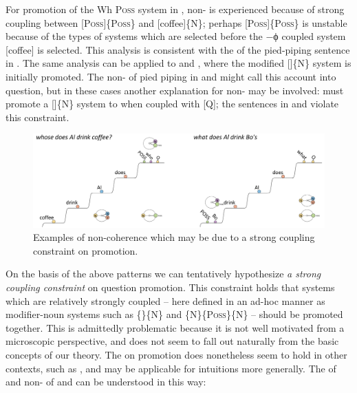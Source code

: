 For promotion of the {\textbar}Wh P\textsc{oss}{\textbar} system in , non- is experienced because of strong coupling between [P\textsc{oss}]\{P\textsc{oss}\} and [coffee]\{N\}; perhaps [P\textsc{oss}]\linebreak\{P\textsc{oss}\} is unstable because of the types of systems which are selected before the −ϕ coupled system [coffee] is selected. This analysis is consistent with the  of the pied-piping sentence in . The same analysis can be applied to  and , where the modified []\{N\} system is initially promoted. The non- of pied piping in  and  might call this account into question, but in these cases another explanation for non- may be involved:  must promote a []\{N\} system to  when coupled with [Q]; the sentences in  and  violate this constraint. 

  
\begin{figure}
\includegraphics[width=\textwidth]{figures/Tilsen-img166.png}
\caption{Examples of non-coherence which may be due to a strong coupling constraint on promotion.}
\label{fig:7:22}
\end{figure}
 

  On the basis of the above patterns we can tentatively hypothesize \textit{a strong coupling constraint} on question promotion. This constraint holds that systems which are relatively strongly coupled -- here defined in an ad-hoc manner as modifier-noun systems such as \{\}\{N\} and \{N\}\{P\textsc{oss}\}\{N\} -- should be promoted together. This is admittedly problematic because it is not well motivated from a microscopic perspective, and does not seem to fall out naturally from the basic concepts of our theory. The  on promotion does nonetheless seem to hold in other contexts, such as , and may be applicable for  intuitions more generally. The  of  and non- of  and  can be understood in this way:

